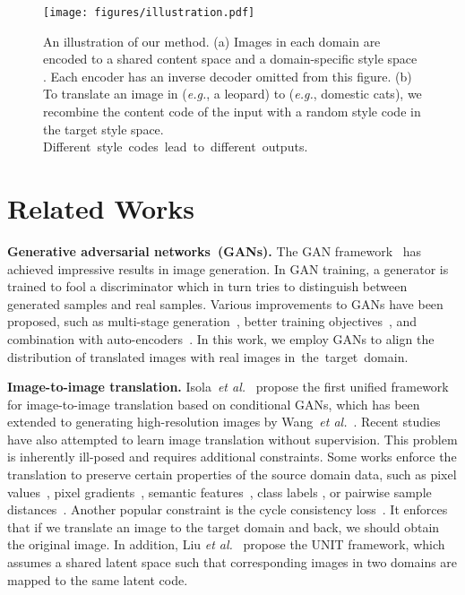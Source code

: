 \documentclass[runningheads]{llncs}
\newcommand{\vpara}[1]{\vspace{0.05in}\noindent\textbf{#1}}
\def\etal{\emph{et al.}\xspace}
\begin{document}
	
	\begin{figure*}[!tb]
		\centering
		\texttt{[image: figures/illustration.pdf]}
		\caption{An illustration of our method. (a) Images in each domain  are encoded to a shared content space  and a domain-specific style space . Each encoder has an inverse decoder omitted from this figure. (b) To translate an image in  (\textit{e.g.}, a leopard) to  (\textit{e.g.}, domestic cats), we recombine the content code of the input with a random style code in the target style space. \mbox{Different style codes lead to different outputs.}}
		\label{fig:illustration}
	\end{figure*}
	
	\section{Related Works}	\label{sec::related}

	\vpara{Generative adversarial networks~(GANs).} The GAN framework~\cite{goodfellow2014generative} has achieved impressive results in image generation. In GAN training, a generator is trained to fool a discriminator which in turn tries to distinguish between generated samples and real samples.
	Various improvements to GANs have been proposed, such as multi-stage generation~\cite{denton2015deep,wang2016generative,yang2017lrgan,huang2017sgan,zhang2017stackgan,karras2018progressive}, better training objectives~\cite{salimans2016improved,zhao2016energy,arjovsky2017wasserstein,berthelot2017began,mao2017least,tolstikhin2018wasserstein}, and combination with auto-encoders~\cite{larsen2016autoencoding,dosovitskiy2016generating,rosca2017variational,li2017alice,srivastava2017veegan}. 
	In this work, we employ GANs to align the distribution of translated images with real images \mbox{in the target domain.}
	
	\vpara{Image-to-image translation.} Isola~\etal~\cite{isola2017image} propose the first unified framework for image-to-image translation based on conditional GANs, which has been extended to generating high-resolution images by Wang~\etal~\cite{wang2018high}. 
Recent studies have also attempted to learn image translation without supervision. 
	This problem is inherently ill-posed and requires additional constraints.
	Some works enforce the translation to preserve certain properties of the source domain data, such as pixel values~\cite{shrivastava2017learning}, pixel gradients~\cite{bousmalis2017unsupervised}, semantic features~\cite{taigman2017unsupervised}, class labels \cite{bousmalis2017unsupervised}, or pairwise sample distances~\cite{benaim2017one}. Another popular constraint is the cycle consistency loss~\cite{yi2017dualgan,zhu2017unpaired,kim2017learning}. It enforces that if we translate an image to the target domain and back, we should obtain the original image. In addition, Liu \etal~\cite{liu2017unsupervised} propose the UNIT framework, which assumes a shared latent space such that corresponding images in two domains are mapped to the same latent code. 
\end{document}
